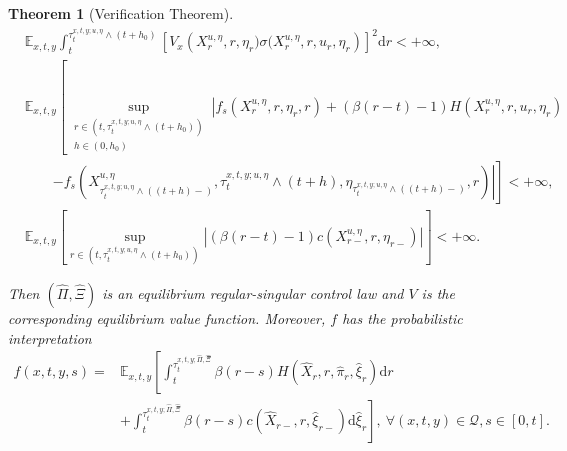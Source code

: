 \documentclass[11pt,reqno]{article}%
\newtheorem{theorem}{Theorem}[section]
\numberwithin{equation}{section}
\begin{document}
\begin{theorem}[Verification Theorem]
\begin{align}
&\mathbb{E}_{x,t,y}\int_{t}^{\tau^{x,t,y;u,\eta}_{t}\wedge(t+h_0)}\left[V_{x}\left(X^{u,\eta}_{r},r,\eta_{r})\sigma(X^{u,\eta}_{r},r,u_r,\eta_{r}\right)\right]^{2}\mathrm{d}r<+\infty,\label{martingale2}\\
&\mathbb{E}_{x,t,y}\left[\sup\limits_{\substack{r\in(t,\tau^{x,t,y;u,\eta}_{t}\wedge(t+h_{0}))\\ h\in(0,h_{0})}}\left|f_s\left(X^{u,\eta}_{r},r,\eta_{r},r\right)+(\beta(r-t)-1) H\left(X^{u,\eta}_r, r,u_r, \eta_r \right)\right.\right.\nonumber\\
&\quad\quad\left.\left.-f_s\left(X^{u,\eta}_{\tau^{x,t,y;u,\eta}_{t}\wedge((t+h)-)},\tau^{x,t,y;u,\eta}_{t}\wedge(t+h),\eta_{\tau^{x,t,y;u,\eta}_{t}\wedge((t+h)-)},r\right)\right|\right]<+\infty,\label{integrability}\\
&\mathbb{E}_{x,t,y}\left[\sup\limits_{r\in(t,\tau^{x,t,y;u,\eta}_{t}\wedge(t+h_{0}))}\left|(\beta(r-t)-1)c\left(X^{u,\eta}_{r-},r,\eta_{r-}\right)\right|\right]<+\infty.\label{integrability2}
\end{align}%

Then $\left(\hat{\Pi},\hat{\Xi}\right)$ is an equilibrium regular-singular control law and $V$ is the corresponding equilibrium value function. Moreover, $f$ has the probabilistic interpretation
\begin{equation}
\begin{aligned}
\label{intf}
f(x,t,y,s)=&\mathbb{E}_{x,t,y}\left[\int_t^{\tau^{x,t,y;\hat{\Pi},\hat{\Xi}}_{t}} \beta(r-s) H\left(\hat{X}_r, r, \hat\pi_r, \hat{\xi}_r \right) \mathrm{d} r\right. \\
& \left.+\int_t^{\tau^{x,t,y;\hat{\Pi},\hat{\Xi}}_{t}} \beta(r-s) c\left(\hat{X}_{r-}, r, \hat{\xi}_{r-}\right) \mathrm{d} \hat{\xi}_r \right],\ \forall (x,t,y)\in\mathcal{Q}, s\in[0,t].
\end{aligned}
\end{equation}
\end{theorem}
\end{document}
